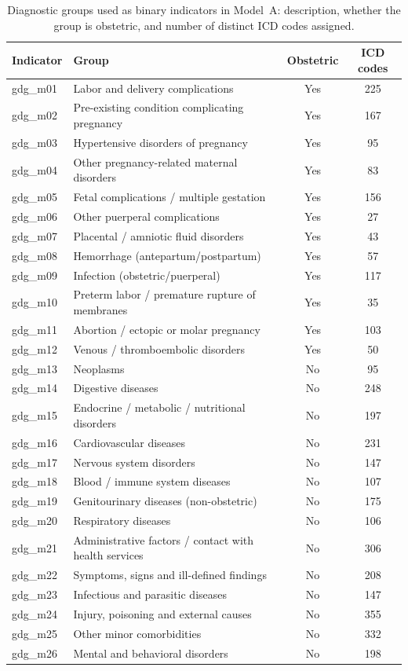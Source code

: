 \documentclass[healthcare,article,submit,pdftex,moreauthors]{Definitions/mdpi}
\begin{document}
\begin{table}[H]
\caption{Diagnostic groups used as binary indicators in Model~A: description, whether the
group is obstetric, and number of distinct ICD codes assigned.\label{tab:gdg}}
\small
\begin{tabularx}{\textwidth}{llcc}
\toprule
\textbf{Indicator} & \textbf{Group} & \textbf{Obstetric} & \textbf{ICD codes}\\
\midrule
gdg\_m01 & Labor and delivery complications & Yes & 225 \\
gdg\_m02 & Pre-existing condition complicating pregnancy & Yes & 167 \\
gdg\_m03 & Hypertensive disorders of pregnancy & Yes & 95 \\
gdg\_m04 & Other pregnancy-related maternal disorders & Yes & 83 \\
gdg\_m05 & Fetal complications / multiple gestation & Yes & 156 \\
gdg\_m06 & Other puerperal complications & Yes & 27 \\
gdg\_m07 & Placental / amniotic fluid disorders & Yes & 43 \\
gdg\_m08 & Hemorrhage (antepartum/postpartum) & Yes & 57 \\
gdg\_m09 & Infection (obstetric/puerperal) & Yes & 117 \\
gdg\_m10 & Preterm labor / premature rupture of membranes & Yes & 35 \\
gdg\_m11 & Abortion / ectopic or molar pregnancy & Yes & 103 \\
gdg\_m12 & Venous / thromboembolic disorders & Yes & 50 \\
gdg\_m13 & Neoplasms & No & 95 \\
gdg\_m14 & Digestive diseases & No & 248 \\
gdg\_m15 & Endocrine / metabolic / nutritional disorders & No & 197 \\
gdg\_m16 & Cardiovascular diseases & No & 231 \\
gdg\_m17 & Nervous system disorders & No & 147 \\
gdg\_m18 & Blood / immune system diseases & No & 107 \\
gdg\_m19 & Genitourinary diseases (non-obstetric) & No & 175 \\
gdg\_m20 & Respiratory diseases & No & 106 \\
gdg\_m21 & Administrative factors / contact with health services & No & 306 \\
gdg\_m22 & Symptoms, signs and ill-defined findings & No & 208 \\
gdg\_m23 & Infectious and parasitic diseases & No & 147 \\
gdg\_m24 & Injury, poisoning and external causes & No & 355 \\
gdg\_m25 & Other minor comorbidities & No & 332 \\
gdg\_m26 & Mental and behavioral disorders & No & 198 \\
\bottomrule
\end{tabularx}
\end{table}
\end{document}
